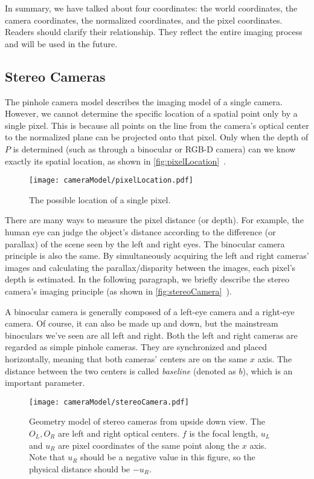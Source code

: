 In summary, we have talked about four coordinates: the world coordinates, the camera coordinates, the normalized coordinates, and the pixel coordinates. Readers should clarify their relationship. They reflect the entire imaging process and will be used in the future.

\subsection{Stereo Cameras}
The pinhole camera model describes the imaging model of a single camera. However, we cannot determine the specific location of a spatial point only by a single pixel. This is because all points on the line from the camera's optical center to the normalized plane can be projected onto that pixel. Only when the depth of $P$ is determined (such as through a binocular or RGB-D camera) can we know exactly its spatial location, as shown in \autoref {fig:pixelLocation}~.

\begin{figure}[!ht]
    \centering
    \texttt{[image: cameraModel/pixelLocation.pdf]}
    \caption{The possible location of a single pixel.}
    \label{fig:pixelLocation}
\end{figure}

There are many ways to measure the pixel distance (or depth). For example, the human eye can judge the object's distance according to the difference (or parallax) of the scene seen by the left and right eyes. The binocular camera principle is also the same. By simultaneously acquiring the left and right cameras' images and calculating the parallax/disparity between the images, each pixel's depth is estimated. In the following paragraph, we briefly describe the stereo camera's imaging principle (as shown in \autoref{fig:stereoCamera}~).

A binocular camera is generally composed of a left-eye camera and a right-eye camera. Of course, it can also be made up and down, but the mainstream binoculars we've seen are all left and right. Both the left and right cameras are regarded as simple pinhole cameras. They are synchronized and placed horizontally, meaning that both cameras' centers are on the same $x$ axis. The distance between the two centers is called \textit {baseline} (denoted as $b$), which is an important parameter.

\begin{figure}[!ht]
    \centering
    \texttt{[image: cameraModel/stereoCamera.pdf]}
    \caption{Geometry model of stereo cameras from upside down view. The $O_L, O_R$ are left and right optical centers. $f$ is the focal length, $u_L$ and $u_R$ are pixel coordinates of the same point along the $x$ axis. Note that $u_R$ should be a negative value in this figure, so the physical distance should be $-u_R$.}
    \label{fig:stereoCamera}
\end{figure}

